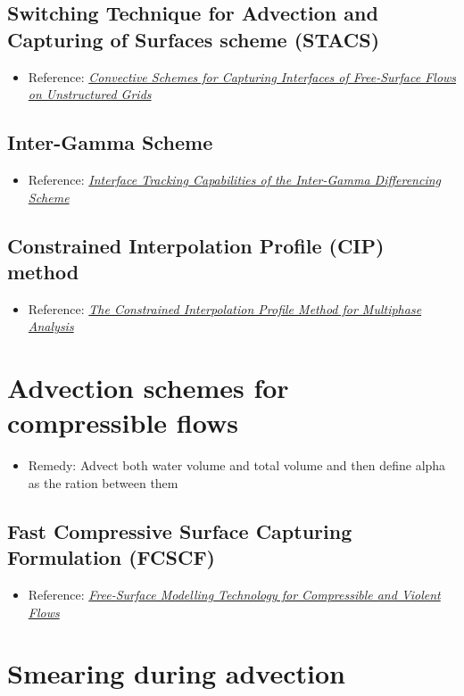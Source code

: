 \subsection{Switching Technique for Advection and Capturing of Surfaces scheme (STACS)}

\begin{itemize}
    \item Reference: \textit{\href{http://webfea-lb.fea.aub.edu.lb/cfd/pdfs/publications2/STACS-Complete.pdf}{Convective Schemes for Capturing Interfaces of Free-Surface Flows on Unstructured Grids}}
\end{itemize}

\subsection{Inter-Gamma Scheme}

\begin{itemize}
    \item Reference: \textit{\href{http://powerlab.fsb.hr/ped/kturbo/openfoam/docs/InterTrack.pdf}{Interface Tracking Capabilities of the Inter-Gamma Differencing Scheme}}
\end{itemize}

\subsection{Constrained Interpolation Profile (CIP) method}


\begin{itemize}
    \item Reference: \textit{\href{http://www.mech.titech.ac.jp/~ryuutai/paper/JCP2001CIPReviewYabe.pdf}{The Constrained Interpolation Profile Method for Multiphase Analysis}}
\end{itemize}

\section{Advection schemes for compressible flows}

\begin{itemize}
    \item Remedy: Advect both water volume and total volume and then define alpha as the ration between them
\end{itemize}

\subsection{Fast Compressive Surface Capturing Formulation (FCSCF)}

\begin{itemize}
    \item Reference: \textit{\href{http://researchspace.csir.co.za/dspace/bitstream/10204/5282/1/Heyns_2011.pdf}{Free-Surface Modelling Technology for Compressible and Violent Flows}}
\end{itemize}

\section{Smearing during advection}